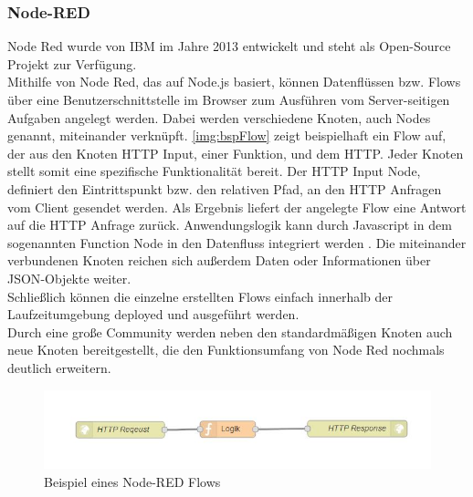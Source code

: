 \subsubsection{Node-RED}
Node Red wurde von IBM im Jahre 2013 entwickelt und steht als Open-Source Projekt zur Verfügung\cite{nodeRed:nodeRedAbout}.\\
Mithilfe von Node Red, das auf Node.js basiert, können Datenflüssen bzw. Flows über eine Benutzerschnittstelle im Browser zum Ausführen vom Server-seitigen Aufgaben angelegt werden. Dabei werden verschiedene Knoten, auch Nodes genannt, miteinander verknüpft. \autoref{img:bspFlow} zeigt beispielhaft ein Flow auf, der aus den Knoten \acf{HTTP} Input, einer Funktion, und dem \ac{HTTP}. Jeder Knoten stellt somit eine spezifische Funktionalität bereit. Der \ac{HTTP} Input Node, definiert den Eintrittspunkt bzw. den relativen Pfad, an den \ac{HTTP} Anfragen vom Client gesendet werden. Als Ergebnis liefert der angelegte Flow eine Antwort auf die \ac{HTTP} Anfrage zurück. Anwendungslogik kann durch Javascript in dem sogenannten Function Node in den Datenfluss integriert werden . Die miteinander verbundenen Knoten reichen sich außerdem Daten oder Informationen über \ac{JSON}-Objekte weiter.
\\Schließlich können die einzelne erstellten Flows einfach innerhalb der Laufzeitumgebung deployed und ausgeführt werden. \\Durch eine große Community werden neben den standardmäßigen Knoten auch neue Knoten bereitgestellt, die den Funktionsumfang von Node Red nochmals deutlich erweitern\cite{nodeRed:nodeRed}.
\begin{figure}[H]
	\centering	
	\includegraphics[scale=0.8]{images/bspFlow}
	\caption{Beispiel eines Node-RED Flows}
	\label{img:bspFlow}
\end{figure}




